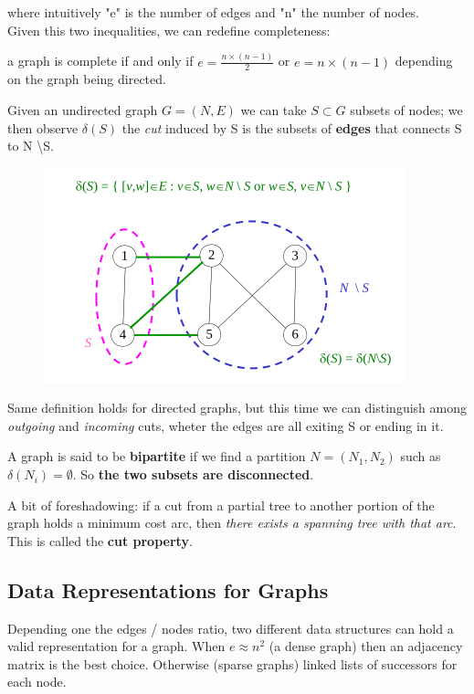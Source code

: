         where intuitively "e" is the number of edges and "n" the number of nodes.\\
        Given this two inequalities, we can redefine completeness: 
        \begin{definition}
            a graph is complete if and only if $e = \frac{n \times (n - 1)}{2}$ or $e = n \times (n - 1)$ depending on the graph being directed.
        \end{definition}
        \begin{definition}
            Given an undirected graph $G = (N, E)$ we can take $S \subset G$ subsets of nodes; we then observe $\delta(S)$ the \textit{cut} induced by S is the subsets of \textbf{edges} that connects S to N \textbackslash S.
        \end{definition}
        \begin{figure}[H]
            \centering
            \includegraphics[width = \textwidth]{./images/Cut.png}
        \end{figure}
        Same definition holds for directed graphs, but this time we can distinguish among \textit{outgoing} and \textit{incoming} cuts, wheter the edges are all exiting S or ending in it.
        \begin{definition}
            A graph is said to be \textbf{bipartite} if we find a partition $N = (N_1, N_2)$ such as $\delta(N_i) = \emptyset$. So \textbf{the two subsets are disconnected}.
        \end{definition}
        A bit of foreshadowing: if a cut from a partial tree to another portion of the graph holds a minimum cost arc, then \textit{there exists a spanning tree with that arc}. This is called the \textbf{cut property}.
            
        \subsection*{Data Representations for Graphs}
            Depending one the edges / nodes ratio, two different data structures can hold a valid representation for a graph. When $e \approx n^2$ (a dense graph) then an adjacency matrix is the best choice. Otherwise (sparse graphs) linked lists of successors for each node.  

